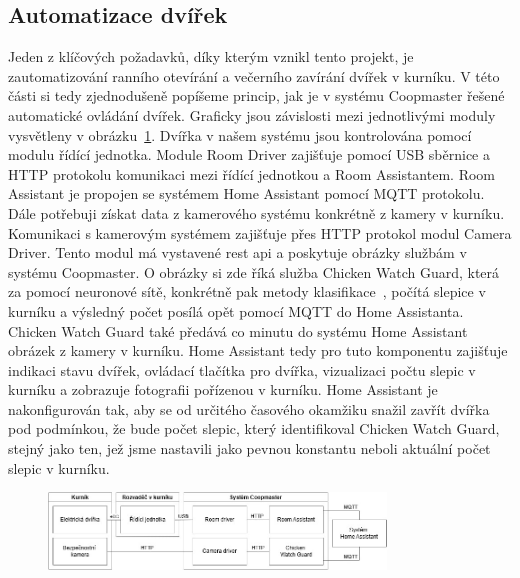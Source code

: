 \subsection{Automatizace dvířek}
Jeden z klíčových požadavků, díky kterým vznikl tento projekt, je zautomatizování ranního otevírání a večerního zavírání dvířek v kurníku.
V této části si tedy zjednodušeně popíšeme princip, jak je v systému Coopmaster řešené automatické ovládání dvířek.
Graficky jsou závislosti mezi jednotlivými moduly vysvětleny v obrázku~\ref{fig:automatizace_dvirek}.\newline
Dvířka v našem systému jsou kontrolována pomocí modulu řídící jednotka.
Module Room Driver zajišťuje pomocí USB sběrnice a HTTP protokolu komunikaci mezi řídící jednotkou a Room Assistantem.
Room Assistant je propojen se systémem Home Assistant pomocí MQTT protokolu.
Dále potřebuji získat data z kamerového systému konkrétně z kamery v kurníku.
Komunikaci s kamerovým systémem zajišťuje přes HTTP protokol modul Camera Driver.
Tento modul má vystavené \gls{rest} \gls{api} a poskytuje obrázky službám v systému Coopmaster.
O obrázky si zde říká služba Chicken Watch Guard, která za pomocí neuronové sítě, konkrétně pak metody klasifikace~\cite{klasifikace}, počítá slepice v kurníku a výsledný počet posílá opět pomocí MQTT do Home Assistanta.
Chicken Watch Guard také předává co minutu do systému Home Assistant obrázek z kamery v kurníku.
Home Assistant tedy pro tuto komponentu zajišťuje indikaci stavu dvířek, ovládací tlačítka pro dvířka, vizualizaci počtu slepic v kurníku a zobrazuje fotografii pořízenou v kurníku.
Home Assistant je nakonfigurován tak, aby se od určitého časového okamžiku snažil zavřít dvířka pod podmínkou, že bude počet slepic, který identifikoval Chicken Watch Guard, stejný jako ten, jež jsme nastavili jako pevnou konstantu neboli aktuální počet slepic v kurníku.
\begin{figure}[H]
    \centering
    \includegraphics[width=0.8\textwidth]{img/automatizace_dvirek}
    \label{fig:automatizace_dvirek}
\end{figure}

